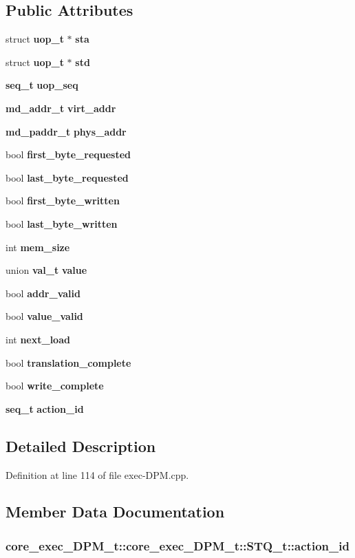 \subsection*{Public Attributes}
\begin{CompactItemize}
\item 
struct {\bf uop\_\-t} $\ast$ {\bf sta}
\item 
struct {\bf uop\_\-t} $\ast$ {\bf std}
\item 
{\bf seq\_\-t} {\bf uop\_\-seq}
\item 
{\bf md\_\-addr\_\-t} {\bf virt\_\-addr}
\item 
{\bf md\_\-paddr\_\-t} {\bf phys\_\-addr}
\item 
bool {\bf first\_\-byte\_\-requested}
\item 
bool {\bf last\_\-byte\_\-requested}
\item 
bool {\bf first\_\-byte\_\-written}
\item 
bool {\bf last\_\-byte\_\-written}
\item 
int {\bf mem\_\-size}
\item 
union {\bf val\_\-t} {\bf value}
\item 
bool {\bf addr\_\-valid}
\item 
bool {\bf value\_\-valid}
\item 
int {\bf next\_\-load}
\item 
bool {\bf translation\_\-complete}
\item 
bool {\bf write\_\-complete}
\item 
{\bf seq\_\-t} {\bf action\_\-id}
\end{CompactItemize}


\subsection{Detailed Description}


Definition at line 114 of file exec-DPM.cpp.

\subsection{Member Data Documentation}
\subsubsection[{action\_\-id}]{ core\_\-exec\_\-DPM\_\-t::core\_\-exec\_\-DPM\_\-t::STQ\_\-t::action\_\-id}\label{structcore__exec__DPM__t_1_1STQ__t_00dbbb9dc309a31e4fa7f48f86d6e1d5}




